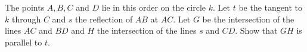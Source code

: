 The points $A, B, C$ and $D$ lie in this order on the circle $k$. Let $t$ be the tangent
to $k$ through $C$ and $s$ the reflection of $AB$ at $AC$. Let $G$ be the intersection of
the lines $AC$ and $BD$ and $H$ the intersection of the lines $s$ and $CD$.
Show that $GH$ is parallel to $t$.